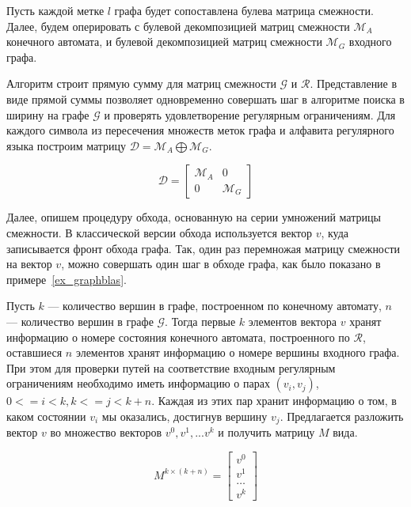 Пусть каждой метке $l$ графа будет сопоставлена булева матрица смежности. Далее, будем оперировать с булевой декомпозицией матриц смежности $\mathcal{M}_A$ конечного автомата, и булевой декомпозицией матриц смежности $\mathcal{M}_G$ входного графа.

Алгоритм строит прямую сумму для матриц смежности $\mathcal{G}$ и $\mathcal{R}$. Представление в виде прямой суммы позволяет одновременно совершать шаг в алгоритме поиска в ширину на графе $\mathcal{G}$ и проверять удовлетворение регулярным ограничениям. Для каждого символа из пересечения множеств меток графа и алфавита регулярного языка построим матрицу $\mathcal{D} = \mathcal{M}_A \bigoplus \mathcal{M}_G$.

\begin{equation}
  \mathcal{D} =
  \left[
    \begin{matrix}
      \mathcal{M}_A & 0             \\
      0             & \mathcal{M}_G
    \end{matrix}
    \right]
\end{equation}

Далее, опишем процедуру обхода, основанную на серии умножений матрицы смежности.
В классической версии обхода используется вектор $v$, куда записывается фронт обхода графа. Так, один раз перемножая матрицу смежности на вектор $v$, можно совершать один шаг в обходе графа, как было показано в примере~\ref{ex_graphblas}.

Пусть $k$ --- количество вершин в графе, построенном по конечному автомату, $n$ --- количество вершин в графе $\mathcal{G}$. Тогда первые $k$ элементов вектора $v$ хранят информацию о номере состояния конечного автомата, построенного по $\mathcal{R}$, оставшиеся $n$ элементов хранят информацию о номере вершины входного графа. При этом для проверки путей на соответствие входным регулярным ограничениям необходимо иметь информацию о парах $(v_i, v_j)$, $0<= i < k, k <= j < k+n$. Каждая из этих пар хранит информацию о том, в каком состоянии $v_i$ мы оказались, достигнув вершину $v_j$. Предлагается разложить вектор $v$ во множество векторов $v^{0}, v^{1}, ... v^{k}$ и получить матрицу $M$ вида.

\begin{equation}
  M^{k \times (k + n)} =
  \left[
    \begin{matrix}
      v^{0} \\
      v^{1} \\
      \dots \\
      v^{k}
    \end{matrix}
    \right]
\end{equation}

